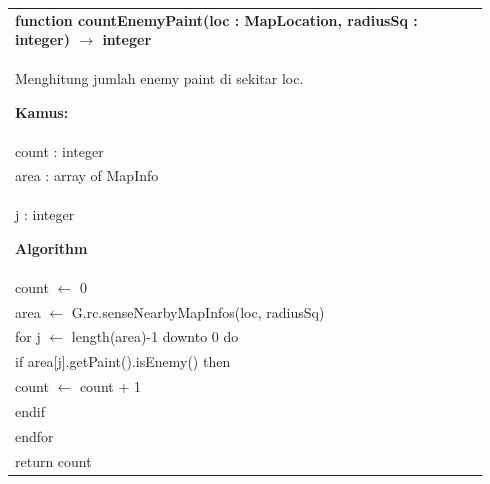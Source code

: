 \documentclass{article}
\newenvironment{pseudobox}
{
\centering
\begin{longtable}{|p{0.94\linewidth}|}
\hline
}
{
\\ \hline
\end{longtable}
\vspace{0.05cm}
}
\begin{document}
\begin{pseudobox}
\textbf{function countEnemyPaint(loc : MapLocation, radiusSq : integer) $\rightarrow$ integer} \\
{ Menghitung jumlah enemy paint di sekitar loc. }

\textbf{Kamus:} \\
\hspace*{1em} count : integer \\
\hspace*{1em} area : array of MapInfo \\
\hspace*{1em} j : integer

\textbf{Algorithm} \\
\hspace*{1em} count $\leftarrow$ 0 \\
\hspace*{1em} area $\leftarrow$ G.rc.senseNearbyMapInfos(loc, radiusSq) \\

\hspace*{1em} for j $\leftarrow$ length(area)-1 downto 0 do \\
\hspace*{2em} if area[j].getPaint().isEnemy() then \\
\hspace*{3em} count $\leftarrow$ count + 1 \\
\hspace*{2em} endif \\
\hspace*{1em} endfor \\

\hspace*{1em} return count
\end{pseudobox}
\end{document}
